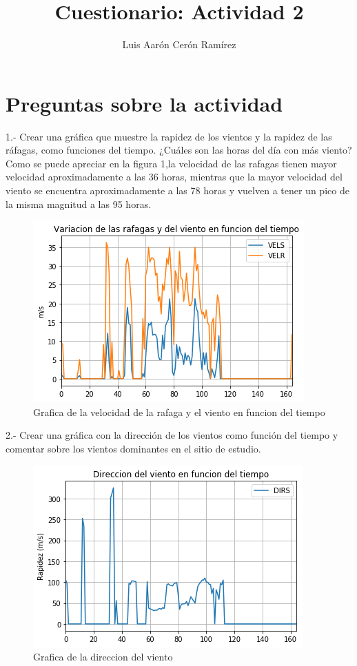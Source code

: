\documentclass{article}
\title{Cuestionario: Actividad 2}
\author{Luis Aarón Cerón Ramírez}
\begin{document}
\maketitle
\section{Preguntas sobre la actividad}
1.- Crear una gráfica que muestre la rapidez de los vientos y la rapidez de las ráfagas, como funciones del tiempo. ¿Cuáles son las horas del día con más viento?
\newline
Como se puede apreciar en la figura 1,la velocidad de las rafagas tienen mayor velocidad aproximadamente a las 36 horas, mientras que la mayor velocidad del viento se encuentra aproximadamente a las 78 horas y vuelven a tener un pico de la misma magnitud a las 95 horas.

\begin{figure}[H]
\centering
\includegraphics[scale=0.6]{rafagaviento.png}
\caption{Grafica de la velocidad de la rafaga y el viento en funcion del tiempo}
\label{figure: rafaga y viento}
\end{figure}

2.- Crear una gráfica con la dirección de los vientos como función del tiempo y comentar sobre los vientos dominantes en el sitio de estudio.

\begin{figure}[H]
\centering
\includegraphics[scale=0.6]{direccion.png}
\caption{Grafica de la direccion del viento}
\label{figure: dirección viento}
\end{figure}
\end{document}
